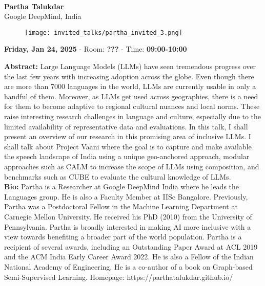 \leavevmode\newline \leavevmode\newline
{\centering
{}\\  \vspace*{-0.1cm} \leavevmode\newline
{\normalsize \textbf{Partha Talukdar}}\\
{\normalsize {Google DeepMind, India}}\\


\begin{figure}[h!]
  \centering
      \texttt{[image: invited\_talks/partha\_invited\_3.png]}
\end{figure}

 {\normalsize \textbf{Friday, Jan 24, 2025} -
 Room: \textbf{???} -
 Time: \textbf{09:00-10:00}\\\leavevmode\newline
 }
}

{\textbf{Abstract:}}
Large Language Models (LLMs) have seen tremendous progress over the last few years with increasing adoption across the globe. Even though there are more than 7000 languages in the world, LLMs are currently usable in only a handful of them. Moreover, as LLMs get used across geographies, there is a need for them to become adaptive to regional cultural nuances and local norms. These raise interesting research challenges in language and culture, especially due to the limited availability of representative data and evaluations. In this talk, I shall present an overview of our research in this promising area of inclusive LLMs. I shall talk about Project Vaani where the goal is to capture and make available the speech landscape of India using a unique geo-anchored approach, modular approaches such as CALM to increase the scope of LLMs using composition, and benchmarks such as CUBE to evaluate the cultural knowledge of LLMs.\\

{\textbf{Bio:}}
Partha is a Researcher at Google DeepMind India where he leads the Languages group. He is also a Faculty Member at IISc Bangalore. Previously, Partha was a Postdoctoral Fellow in the Machine Learning Department at Carnegie Mellon University. He received his PhD (2010) from the University of Pennsylvania. Partha is broadly interested in making AI more inclusive with a view towards benefiting a broader part of the world population. Partha is a recipient of several awards, including an Outstanding Paper Award at ACL 2019 and the ACM India Early Career Award 2022. He is also a Fellow of the Indian National Academy of Engineering. He is a co-author of a book on Graph-based Semi-Supervised Learning. Homepage: https://parthatalukdar.github.io/\\

\clearpage